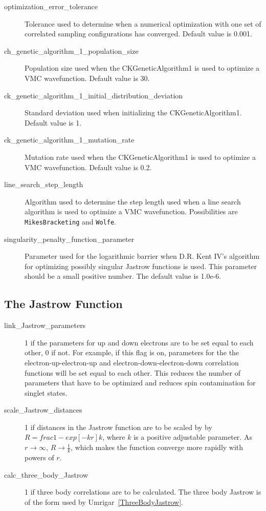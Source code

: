 \documentclass{article}
\begin{document}
\begin{description}
\item [optimization\_error\_tolerance] Tolerance used to determine
  when a numerical optimization with one set of correlated sampling
  configurations has converged.  Default value is 0.001.

\item [ch\_genetic\_algorithm\_1\_population\_size] Population size
  used when the CKGeneticAlgorithm1 is used to optimize a VMC
  wavefunction.  Default value is 30.

\item [ck\_genetic\_algorithm\_1\_initial\_distribution\_deviation]
  Standard deviation used when initializing the CKGeneticAlgorithm1.
  Default value is 1.

\item [ck\_genetic\_algorithm\_1\_mutation\_rate] Mutation rate used
  when the CKGeneticAlgorithm1 is used to optimize a VMC
  wavefunction.  Default value is 0.2.  
 
\item [line\_search\_step\_length] Algorithm used to determine the
  step length used when a line search algorithm is used to optimize a
  VMC wavefunction.  Possibilities are \verb-MikesBracketing- and
  \verb-Wolfe-.

\item [singularity\_penalty\_function\_parameter] Parameter used
  for the logarithmic barrier when D.R. Kent IV's algorithm for
  optimizing possibly singular Jastrow functions is used.  This
  parameter should be a small positive number.  The default value is
  1.0e-6.

\end{description}

\subsection{The Jastrow Function}

\begin{description}

\item [link\_Jastrow\_parameters] 1 if the parameters for up and down
  electrons are to be set equal to each other, 0 if not.  For example,
  if this flag is on, parameters for the the electron-up-electron-up
  and electron-down-electron-down correlation functions will be set
  equal to each other.  This reduces the number of parameters that
  have to be optimized and reduces spin contamination for singlet
  states.  

\item [scale\_Jastrow\_distances] 1 if distances in the Jastrow function
  are to be scaled by by $R=frac{1-exp[-kr]}{k}$, where $k$ is a
  positive adjustable parameter.  As $r \rightarrow \infty$, 
  $R \rightarrow \frac{1}{k}$, which makes the function converge more
  rapidly with powers of $r$. 

\item [calc\_three\_body\_Jastrow] 1 if three body correlations are to be
  calculated.  The three body Jastrow is of the form used by
  Umrigar~\ref{ThreeBodyJastrow}.

\end{description}
\end{document}
